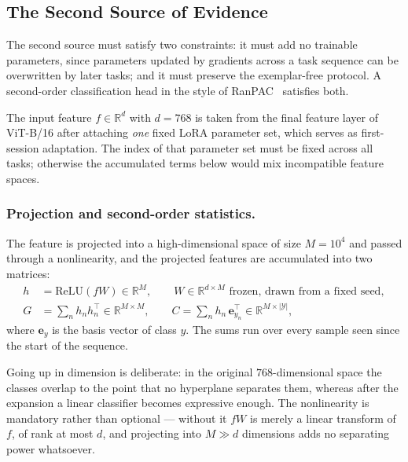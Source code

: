 \documentclass[runningheads]{llncs}
\begin{document}
\subsection{The Second Source of Evidence}

The second source must satisfy two constraints: it must add no trainable
parameters, since parameters updated by gradients across a task sequence can be
overwritten by later tasks; and it must preserve the exemplar-free protocol. A
second-order classification head in the style of RanPAC~\cite{ref_ranpac}
satisfies both.

The input feature $f \in \mathbb{R}^{d}$ with $d = 768$ is taken from the final
feature layer of ViT-B/16 after attaching \emph{one} fixed LoRA parameter set,
which serves as first-session adaptation. The index of that parameter set must be
fixed across all tasks; otherwise the accumulated terms below would mix
incompatible feature spaces.

\subsubsection{Projection and second-order statistics.}
The feature is projected into a high-dimensional space of size $M = 10^4$ and
passed through a nonlinearity, and the projected features are accumulated into
two matrices:
\begin{align}
h &= \mathrm{ReLU}(f W) \in \mathbb{R}^{M},
\qquad W \in \mathbb{R}^{d \times M} \text{ frozen, drawn from a fixed seed},
\label{eq:proj}\\
G &= \sum_n h_n h_n^{\top} \in \mathbb{R}^{M \times M},
\qquad
C = \sum_n h_n\, \mathbf{e}_{y_n}^{\top}
   \in \mathbb{R}^{M \times |\mathcal{Y}|},
\label{eq:gram}
\end{align}
where $\mathbf{e}_{y}$ is the basis vector of class $y$. The sums run over every
sample seen since the start of the sequence.

Going up in dimension is deliberate: in the original $768$-dimensional space the
classes overlap to the point that no hyperplane separates them, whereas after
the expansion a linear classifier becomes expressive enough. The nonlinearity is
mandatory rather than optional --- without it $fW$ is merely a linear transform
of $f$, of rank at most $d$, and projecting into $M \gg d$ dimensions adds no
separating power whatsoever.
\end{document}

